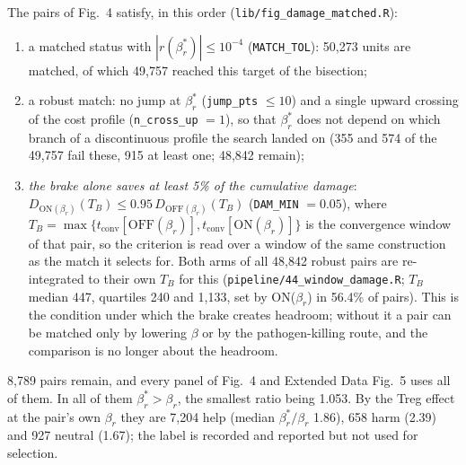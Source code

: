 \documentclass[11pt]{article}
\begin{document}
The pairs of Fig.~4 satisfy, in this order (\texttt{lib/fig\_damage\_matched.R}):
\begin{enumerate}
\item a matched status with $|r(\beta_r^{*})| \le 10^{-4}$ (\texttt{MATCH\_TOL}): 50{,}273 units are
  matched, of which 49{,}757 reached this target of the bisection;
\item a robust match: no jump at $\beta_r^{*}$ (\texttt{jump\_pts} $\le 10$) and a single upward
  crossing of the cost profile (\texttt{n\_cross\_up} $= 1$), so that $\beta_r^{*}$ does not depend on
  which branch of a discontinuous profile the search landed on (355 and 574 of the 49{,}757
  fail these, 915 at least one; 48{,}842 remain);
\item \emph{the brake alone saves at least 5\% of the cumulative damage}:
  $D_{\mathrm{ON}(\beta_r)}(T_B) \le 0.95\, D_{\mathrm{OFF}(\beta_r)}(T_B)$
  (\texttt{DAM\_MIN} $=0.05$), where
  $T_B = \max\{t_{\mathrm{conv}}[\mathrm{OFF}(\beta_r)], t_{\mathrm{conv}}[\mathrm{ON}(\beta_r)]\}$
  is the convergence window of that pair, so the criterion is read over a window of the same
  construction as the match it selects for. Both arms of all 48{,}842 robust pairs are
  re-integrated to their own $T_B$ for this
  (\texttt{pipeline/44\_window\_damage.R}; $T_B$ median 447, quartiles 240 and 1{,}133, set by
  ON($\beta_r$) in 56.4\% of pairs). This is the condition under which the brake creates headroom;
  without it a pair can be matched only by lowering $\beta$ or by the pathogen-killing route, and
  the comparison is no longer about the headroom.
\end{enumerate}
8{,}789 pairs remain, and every panel of Fig.~4 and Extended Data Fig.~5 uses all of them.
In all of them $\beta_r^{*} > \beta_r$, the smallest ratio being 1.053.
By the Treg effect at the pair's own $\beta_r$ they are 7{,}204 help
(median $\beta_r^{*}/\beta_r$ 1.86), 658 harm (2.39) and 927 neutral (1.67); the label is
recorded and reported but not used for selection.
\end{document}
